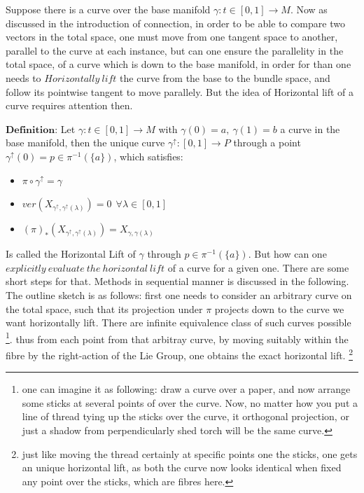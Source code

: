 \documentclass[8pt, twocoloumn]{article}
\begin{document}
Suppose there is a curve over the base manifold $\gamma: t\in[0,1] \to M$. Now as discussed in the introduction of connection, in order to be able to compare two vectors in the total space, one must move from one tangent space to another, parallel to the curve at each instance, but can one ensure the parallelity in the total space, of a curve which is down to the base manifold, in order for than one needs to $Horizontally \ lift$ the curve from the base to the bundle space, and follow its pointwise tangent to move parallely. But the idea of Horizontal lift of a curve requires attention then. 

$\textbf{Definition:}$ Let $\gamma: t\in[0,1] \to M$ with $\gamma(0)=a ,\ \gamma(1)=b$ a curve in the base manifold, then the unique curve $\gamma^{\uparrow} : [0,1] \to P$ through a point $\gamma^{\uparrow}(0) = p \in \pi^{-1}(\{a \})$, which satisfies:

\begin{itemize}
\item $ \pi \circ \gamma^{\uparrow} = \gamma$

\item $ver(X_{\gamma^{\uparrow}, \gamma^{\uparrow}(\lambda)}) = 0  \ \ \forall \lambda \in [0,1]$

\item ${(\pi)}_{*}(X_{\gamma^{\uparrow}, \gamma^{\uparrow}(\lambda)}) = X_{\gamma, \gamma(\lambda)}$
\end{itemize}
Is called the Horizontal Lift of $\gamma$ through $p \in \pi^{-1}(\{a \})$. But how can one $explicitly \  evaluate \  the  \ horizontal \  lift$ of a curve for a given one. There are some short steps for that. 
Methods in sequential manner is discussed in the following. The outline sketch is as follows: first one needs to consider an arbitrary curve on the total space, such that its projection under $\pi$ projects down to the curve we want horizontally lift. There are infinite equivalence class of such curves possible \footnote{one can imagine it as following: draw a curve over a paper, and now arrange some sticks at several points of over the curve. Now, no matter how you put a line of thread tying up the sticks over the curve, it orthogonal projection, or just a shadow from perpendicularly shed torch will be the same curve.}. thus from each point from that arbitray curve, by moving suitably within the fibre by the right-action of the Lie Group, one obtains the exact horizontal lift. \footnote{just like moving the thread certainly at specific points one the sticks, one gets an unique horizontal lift, as both the curve now looks identical when fixed any point over the sticks, which are fibres here.}
\end{document}
